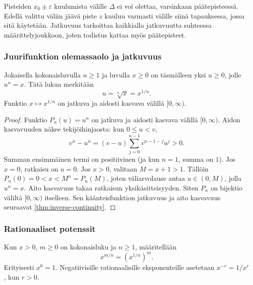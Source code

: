 \documentclass[11pt,a4paper]{amsart}
\begin{document}
\begin{remark}
  Pisteiden $x_0\pm\varepsilon$ kuulumista välille $\Delta$
  ei voi olettaa, varsinkaan päätepisteessä.
  Edellä valittu väliin jäävä piste $z$ kuuluu varmasti välille
  siinä tapauksessa, jossa sitä käytetään.
  Jatkuvuus tarkoittaa kaikkialla jatkuvuutta suhteessa
  määrittelyjoukkoon, joten todistus kattaa myös päätepisteet.
\end{remark}

\newpage
\subsubsection*{Juurifunktion olemassaolo ja jatkuvuus}

\begin{theorem}
  \label{thm:nth-root}
  Jokaisella kokonaisluvulla $n\ge1$ ja luvulla $x\ge0$ on
  täsmälleen yksi $u\ge0$, jolle $u^n=x$. Tätä lukua merkitään
  \[
    u=\sqrt[n]{x}=x^{1/n}.
  \]
  Funktio $x\mapsto x^{1/n}$ on jatkuva ja aidosti kasvava
  välillä $[0,\infty)$.
\end{theorem}
\begin{proof}
  Funktio $P_n(u)=u^n$ on jatkuva ja aidosti kasvava välillä
  $[0,\infty)$. Aidon kasvavuuden näkee tekijöihinjaosta:
  kun $0\le u<v$,
  \[
    v^n-u^n=(v-u)\sum_{j=0}^{n-1}v^{n-1-j}u^j>0.
  \]
  Summan ensimmäinen termi on positiivinen (ja kun $n=1$,
  summa on $1$).
  Jos $x=0$, ratkaisu on $u=0$. Jos $x>0$, valitaan $M=x+1>1$.
  Tällöin $P_n(0)=0<x<M^n=P_n(M)$, joten väliarvolause
  antaa $u\in(0,M)$, jolla $u^n=x$.
  Aito kasvavuus takaa ratkaisun yksikäsitteisyyden.
  Siten $P_n$ on bijektio väliltä $[0,\infty)$ itselleen.
  Sen käänteisfunktion jatkuvuus ja aito kasvavuus seuraavat
  \cref{thm:inverse-continuity}.
\end{proof}

\subsubsection*{Rationaaliset potenssit}

\begin{definition}
  Kun $x>0$, $m\ge0$ on kokonaisluku ja $n\ge1$, määritellään
  \[
    x^{m/n}=\left(x^{1/n}\right)^m.
  \]
  Erityisesti $x^0=1$. Negatiivisille rationaalisille eksponenteille
  asetetaan $x^{-r}=1/x^r$, kun $r>0$.
\end{definition}
\end{document}
